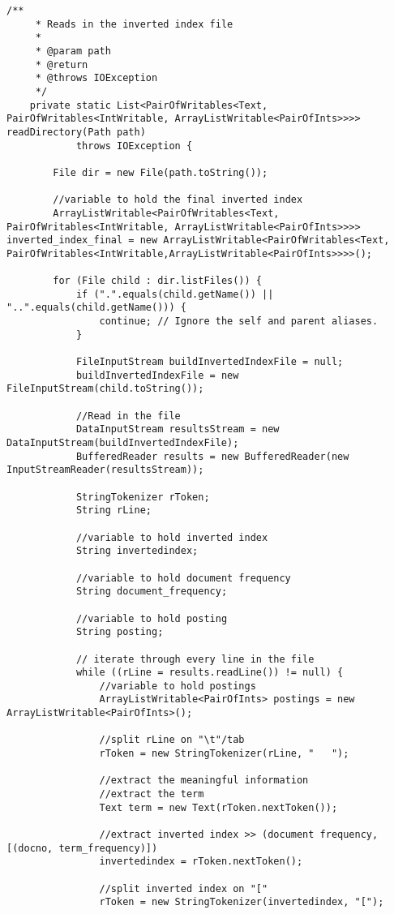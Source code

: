 \documentclass{article} %
\begin{document}
\begin{lstlisting}[style=Java]
	/**
	 * Reads in the inverted index file
	 * 
	 * @param path
	 * @return
	 * @throws IOException
	 */
	private static List<PairOfWritables<Text, PairOfWritables<IntWritable, ArrayListWritable<PairOfInts>>>> readDirectory(Path path)
			throws IOException {
		
		File dir = new File(path.toString());
		
		//variable to hold the final inverted index
        ArrayListWritable<PairOfWritables<Text, PairOfWritables<IntWritable, ArrayListWritable<PairOfInts>>>> inverted_index_final = new ArrayListWritable<PairOfWritables<Text, PairOfWritables<IntWritable,ArrayListWritable<PairOfInts>>>>();
        
        for (File child : dir.listFiles()) {
			if (".".equals(child.getName()) || "..".equals(child.getName())) {
				continue; // Ignore the self and parent aliases.
			}
			
			FileInputStream buildInvertedIndexFile = null;
			buildInvertedIndexFile = new FileInputStream(child.toString());
			
			//Read in the file
			DataInputStream resultsStream = new DataInputStream(buildInvertedIndexFile);
			BufferedReader results = new BufferedReader(new InputStreamReader(resultsStream));
			
			StringTokenizer rToken;
			String rLine;
			
			//variable to hold inverted index
			String invertedindex;
			
			//variable to hold document frequency
            String document_frequency;
            
            //variable to hold posting
            String posting;
			
            // iterate through every line in the file
			while ((rLine = results.readLine()) != null) {
				//variable to hold postings
                ArrayListWritable<PairOfInts> postings = new ArrayListWritable<PairOfInts>();
                
                //split rLine on "\t"/tab
				rToken = new StringTokenizer(rLine, "	");
				
				//extract the meaningful information
				//extract the term
				Text term = new Text(rToken.nextToken());
				
				//extract inverted index >> (document frequency, [(docno, term_frequency)])
				invertedindex = rToken.nextToken();
				
				//split inverted index on "["
                rToken = new StringTokenizer(invertedindex, "[");
                

\end{lstlisting}
\end{document}
